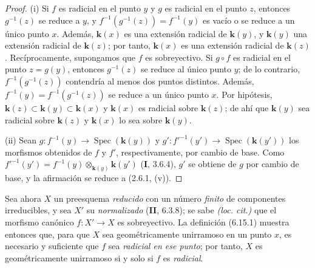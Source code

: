 \begin{proof}
(i) Si $f$ es radicial en el punto $y$ y $g$ es radicial en el
punto $z$, entonces $g^{-1}(z)$ se reduce a $y$, y
$f^{-1}(g^{-1}(z))=f^{-1}(y)$ es vacío o se reduce a un único
punto $x$. Además, $\boldsymbol{k}(x)$ es una extensión radicial de $\boldsymbol{k}(y)$,
y $\boldsymbol{k}(y)$ una extensión radicial de $\boldsymbol{k}(z)$; por tanto, $\boldsymbol{k}(x)$ es
una extensión radicial de $\boldsymbol{k}(z)$. Recíprocamente, supongamos
que $f$ es sobreyectivo. Si $g\circ f$ es radicial en el punto
$z=g(y)$, entonces $g^{-1}(z)$ se reduce al único punto $y$;
de lo contrario, $f^{-1}(g^{-1}(z))$ contendría al menos dos
puntos distintos. Además,
$f^{-1}(y)=f^{-1}(g^{-1}(z))$ se reduce a un único punto $x$.
Por hipótesis, $\boldsymbol{k}(z)\subset \boldsymbol{k}(y)\subset \boldsymbol{k}(x)$ y $\boldsymbol{k}(x)$ es
radicial sobre $\boldsymbol{k}(z)$; de ahí que $\boldsymbol{k}(y)$ sea radicial sobre
$\boldsymbol{k}(z)$ y $\boldsymbol{k}(x)$ lo sea sobre $\boldsymbol{k}(y)$.

(ii) Sean $g:f^{-1}(y)\to\operatorname{Spec}(\boldsymbol{k}(y))$ y
$g':f'^{-1}(y')\to\operatorname{Spec}(\boldsymbol{k}(y'))$ los morfismos
obtenidos de $f$ y $f'$, respectivamente, por cambio de base.
Como $f'^{-1}(y')=f^{-1}(y)\otimes_{\mathbf{k}(y)}\boldsymbol{k}(y')$ (\textbf I, 3.6.4),
$g'$ se obtiene de $g$ por cambio de base, y la afirmación se
reduce a (2.6.1, (v)).
\end{proof}

Sea ahora $X$ un preesquema \emph{reducido} con un número \emph{finito} de
componentes irreducibles, y sea $X'$ su \emph{normalizado} (\textbf{II}, 6.3.8);
se sabe \emph{(loc. cit.)} que el morfismo canónico $f:X'\to X$ es
sobreyectivo. La definición (6.15.1) muestra entonces que, para
que $X$ sea geométricamente unirramoso en un punto $x$, es
necesario y suficiente que $f$ sea \emph{radicial en ese punto}; por
tanto, $X$ es geométricamente unirramoso si y solo si $f$ es
\emph{radicial}.
